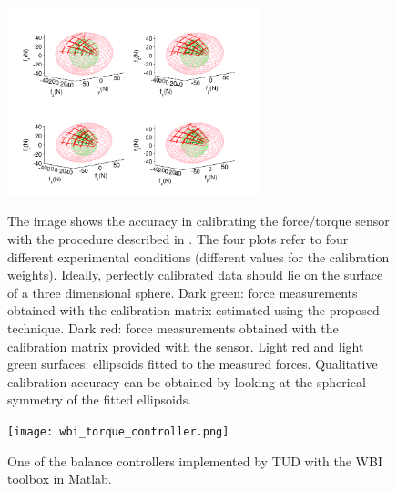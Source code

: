 \begin{figure}[h]
\vspace{0.5em}
\centering
{\includegraphics[width=0.65\textwidth]{images/leg_validation.pdf}}
\caption{The image shows the accuracy in calibrating the force/torque sensor
  with the procedure described in \cite{Traversaro2015b}. The four plots refer
  to four different experimental conditions (different values for the
  calibration weights).  Ideally, perfectly calibrated data should lie on the
  surface of a three dimensional sphere. Dark green: force measurements
  obtained with the calibration matrix estimated using the proposed
  technique. Dark red: force measurements obtained with the calibration matrix
  provided with the sensor.  Light red and light green surfaces: ellipsoids
  fitted to the measured forces.  Qualitative calibration accuracy can be
  obtained by looking at the spherical symmetry of the fitted ellipsoids.}
\label{fig:validation}
\end{figure}

 \begin{figure}
 \centering
 \texttt{[image: wbi\_torque\_controller.png]}
  \caption{One of the balance controllers implemented by TUD with the WBI
    toolbox in Matlab.  }
 \label{fig:wbitud}
 \end{figure}

